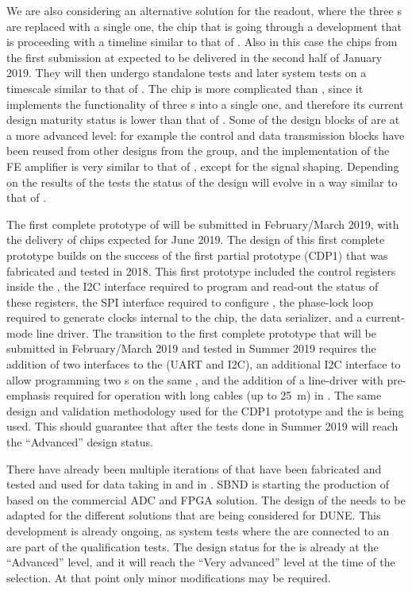We are also considering an alternative solution for the readout, where
the three s are replaced with a single one, the 
chip that is going through a development that is proceeding with a 
timeline similar to that of . Also in this case the
chips from the first submission at expected to be delivered in the
second half of January 2019. They will then undergo standalone tests
and later system tests on a timescale similar to that of .
The  chip is more complicated than ,
since it implements the functionality of three s into a
single one, and therefore its current design maturity status is
lower than that of . Some of the design blocks of
 are at a more advanced level: for example the control
and data transmission blocks have been reused from other 
designs from the  group, and the implementation of the FE amplifier
is very similar to that of , except for the signal 
shaping. Depending on the results of the tests the status of the
 design will evolve in a way similar to that of .

The first complete prototype of  will be submitted in 
February/March 2019, with the delivery of chips expected for June 2019.
The design of this first complete prototype builds on the success of
the first partial prototype (CDP1) that was fabricated and tested in 2018.
This first prototype included the control registers inside the 
, the I2C interface required to program and read-out
the status of these registers, the SPI interface required to
configure , the phase-lock loop required to generate
clocks internal to the chip, the data serializer, and a current-mode
line driver. The transition to the first complete prototype that
will be submitted in February/March 2019 and tested in Summer 2019
requires the addition of two interfaces to the  (UART
and I2C), an additional I2C interface to allow programming two
 s on the same , and the
addition of a line-driver with pre-emphasis required for operation
with long cables (up to \SI{25}{m}) in \lar. The same design and
validation methodology used for the CDP1 prototype and the 
is being used. This should guarantee that after the tests done in
Summer 2019  will reach the ``Advanced'' design 
status. 

There have already been multiple iterations of  that
have been fabricated and tested and used for data taking in 
 and in . SBND is starting the
production of  based on the commercial ADC and
FPGA solution. The design of the  needs to be adapted
for the different  solutions that are being considered
for DUNE. This development is already ongoing, as system tests 
where the  are connected to an  are part
of the qualification tests. The design status for the 
is already at the ``Advanced'' level, and it will reach the 
``Very advanced'' level at the time of the 
selection. At that point only minor modifications may be
required. 

